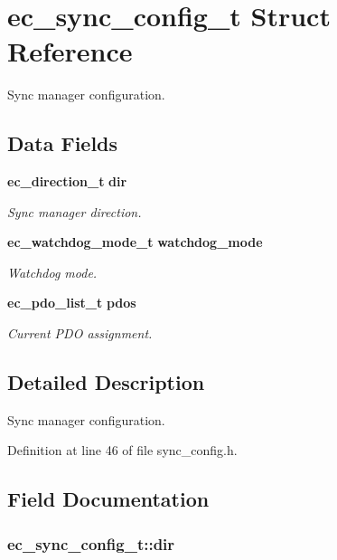 \section{ec\-\_\-sync\-\_\-config\-\_\-t \-Struct \-Reference}
\label{structec__sync__config__t}


\-Sync manager configuration.  


\subsection*{\-Data \-Fields}
\begin{DoxyCompactItemize}
\item 
{\bf ec\-\_\-direction\-\_\-t} {\bf dir}
\begin{DoxyCompactList}\small\item\em \-Sync manager direction. \end{DoxyCompactList}\item 
{\bf ec\-\_\-watchdog\-\_\-mode\-\_\-t} {\bf watchdog\-\_\-mode}
\begin{DoxyCompactList}\small\item\em \-Watchdog mode. \end{DoxyCompactList}\item 
{\bf ec\-\_\-pdo\-\_\-list\-\_\-t} {\bf pdos}
\begin{DoxyCompactList}\small\item\em \-Current \-P\-D\-O assignment. \end{DoxyCompactList}\end{DoxyCompactItemize}


\subsection{\-Detailed \-Description}
\-Sync manager configuration. 

\-Definition at line 46 of file sync\-\_\-config.\-h.



\subsection{\-Field \-Documentation}
\subsubsection[{dir}]{ {\bf ec\-\_\-sync\-\_\-config\-\_\-t\-::dir}}\label{structec__sync__config__t_a24246e2777a46c8aa69dcfbe6a32e4c7}


